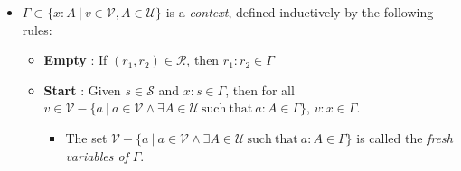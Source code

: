 \begin{definition}
\begin{itemize}
        \item $\Gamma \subset \{x : A\ |\ v\in\mathcal{V},A \in \mathcal{U}\}$ is a \emph{context}, defined inductively by the following rules:
            \begin{itemize}
                \item \textbf{Empty} : If $(r_1,r_2)\in\mathcal{R}$, then $r_1 : r_2 \in \Gamma$
                \item \textbf{Start} : Given $s\in\mathcal{S}$ and $x : s \in \Gamma$, then for all $v \in \mathcal{V} - \{a\ |\ a \in \mathcal{V} \land \exists A\in\mathcal{U} \ \mathrm{such \ that\ } a : A \in \Gamma \}$, $v : x \in \Gamma$.
                \begin{itemize}
                    \item The set $\mathcal{V} - \{a\ |\ a \in \mathcal{V} \land \exists A\in\mathcal{U} \ \mathrm{such \ that\ } a : A \in \Gamma \}$ is called the \emph{fresh variables of} $\Gamma$. 
                \end{itemize}
            \end{itemize}
        

\end{itemize}
\end{definition}
